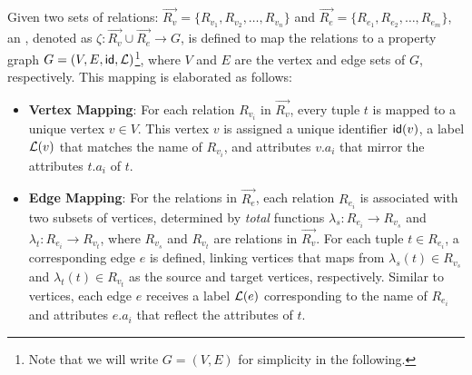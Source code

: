\begin{definition}[\rgmapping, $\zeta$]
\label{def:rgmapping}
Given two sets of relations: \(\vec{R_v} = \{R_{v_1}, R_{v_2}, \ldots, R_{v_n}\}\) and \(\vec{R_e} = \{R_{e_1}, R_{e_2}, \ldots, R_{e_m}\}\), an \rgmapping, denoted as \(\zeta: \vec{R_v} \cup \vec{R_e} \to G\), is defined to map the relations to a property graph \(G = (V, E, {\mathsf{id}}, \mathcal{L})\)\footnote{Note that we will write $G = (V, E)$ for simplicity in the following.}, where \(V\) and \(E\) are the vertex and edge sets of \(G\), respectively. This mapping is elaborated as follows:

\begin{itemize}
\item \textbf{Vertex Mapping}: For each relation \(R_{v_i}\) in \(\vec{R_v}\), every tuple \(t\) is mapped to a unique vertex \(v \in V\). This vertex \(v\) is assigned a unique identifier \({\mathsf{id}}(v)\), a label \(\mathcal{L}(v)\) that matches the name of \(R_{v_i}\), and attributes \(v.a_i\) that mirror the attributes \(t.a_i\) of \(t\).

\item \textbf{Edge Mapping}: For the relations in \(\vec{R_e}\), each relation \(R_{e_i}\) is associated with two subsets of vertices, determined by \emph{total} functions \(\lambda_s: R_{e_i} \to R_{v_s}\) and \(\lambda_t: R_{e_i} \to R_{v_t}\), where \(R_{v_s}\) and \(R_{v_t}\) are relations in \(\vec{R_v}\). For each tuple \(t \in R_{e_i}\), a corresponding edge \(e\) is defined, linking vertices that \rgmapping maps from \(\lambda_s(t) \in R_{v_s}\) and \(\lambda_t(t) \in R_{v_t}\) as the source and target vertices, respectively. Similar to vertices, each edge \(e\) receives a label \(\mathcal{L}(e)\) corresponding to the name of \(R_{e_i}\) and attributes \(e.a_i\) that reflect the attributes of \(t\).

\end{itemize}
\end{definition}


